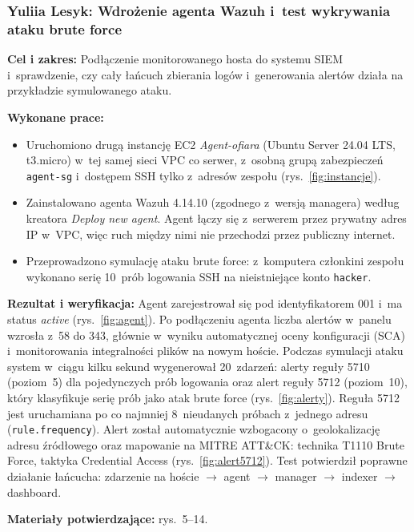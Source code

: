 \documentclass[11pt,a4paper,oneside]{article}
\newcommand{\studentB}{{Yuliia Lesyk}}
\begin{document}
\subsubsection{\studentB: Wdrożenie agenta Wazuh i~test wykrywania ataku brute force}\label{zadanie-b2}
\textbf{Cel i zakres:} Podłączenie monitorowanego hosta do systemu SIEM i~sprawdzenie, czy cały łańcuch zbierania logów i~generowania alertów działa na przykładzie symulowanego ataku.\par
\textbf{Wykonane prace:}
\begin{itemize}
\item Uruchomiono drugą instancję EC2 \textit{Agent-ofiara} (Ubuntu Server 24.04 LTS, t3.micro) w~tej samej sieci VPC co serwer, z~osobną grupą zabezpieczeń \texttt{agent-sg} i~dostępem SSH tylko z~adresów zespołu (rys.~\ref{fig:instancje}).
\item Zainstalowano agenta Wazuh 4.14.10 (zgodnego z~wersją managera) według kreatora \textit{Deploy new agent}. Agent łączy się z~serwerem przez prywatny adres IP w~VPC, więc ruch między nimi nie przechodzi przez publiczny internet.
\item Przeprowadzono symulację ataku brute force: z~komputera członkini zespołu wykonano serię 10~prób logowania SSH na nieistniejące konto \texttt{hacker}.
\end{itemize}
\textbf{Rezultat i weryfikacja:} Agent zarejestrował się pod identyfikatorem 001 i~ma status \textit{active} (rys.~\ref{fig:agent}). Po podłączeniu agenta liczba alertów w~panelu wzrosła z~58 do 343, głównie w~wyniku automatycznej oceny konfiguracji (SCA) i~monitorowania integralności plików na nowym hoście. Podczas symulacji ataku system w~ciągu kilku sekund wygenerował 20~zdarzeń: alerty reguły 5710 (poziom~5) dla pojedynczych prób logowania oraz alert reguły 5712 (poziom~10), który klasyfikuje serię prób jako atak brute force (rys.~\ref{fig:alerty}). Reguła 5712 jest uruchamiana po co najmniej 8~nieudanych próbach z~jednego adresu (\texttt{rule.frequency}). Alert został automatycznie wzbogacony o~geolokalizację adresu źródłowego oraz mapowanie na MITRE ATT\&CK: technika T1110 Brute Force, taktyka Credential Access (rys.~\ref{fig:alert5712}). Test potwierdził poprawne działanie łańcucha: zdarzenie na hoście $\rightarrow$ agent $\rightarrow$ manager $\rightarrow$ indexer $\rightarrow$ dashboard.\par
\textbf{Materiały potwierdzające:} rys.~5--14.

\end{document}
